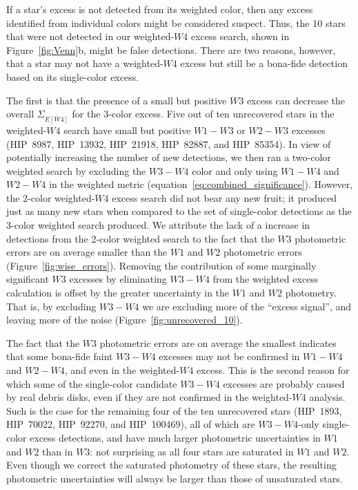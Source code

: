    	If a star's excess is not detected from its weighted color, then any excess identified from individual colors might be considered suspect. Thus, the 10 stars that were not detected in our weighted-$W4$ excess search, shown in Figure~\ref{fig:Venn}b, might be false detections. There are two reasons, however, that a star may not have a weighted-$W4$ excess but still be a bona-fide detection based on its single-color excess. 
   
   The first is that the presence of a small but positive $W3$ excess can decrease the overall $\Sigma_{\overline{E[W4]}}$ for the 3-color excess. Five %
   out of ten unrecovered stars in the weighted-$W4$ search have small but positive $W1-W3$ or $W2-W3$ excesses (HIP~8987, HIP~13932, HIP~21918, %
   HIP~82887, and HIP~85354). In view of potentially increasing the number of new detections, we then ran a two-color weighted search by excluding the $W3-W4$ color and only using $W1-W4$ and $W2-W4$ in the weighted metric (equation~\ref{eq:combined_significance}). However, the 2-color weighted-$W4$ excess search did not bear any new fruit; it produced just as many new stars when compared to the set of single-color detections as the 3-color weighted search produced. We attribute the lack of a increase in detections from the 2-color weighted search to the fact that the $W3$ photometric errors are on average smaller than the $W1$ and $W2$ photometric errors (Figure~\ref{fig:wise_errors}). Removing the contribution of some marginally significant $W3$ excesses by eliminating $W3-W4$ from the weighted excess calculation is offset by the greater uncertainty in the $W1$ and $W2$ photometry. That is, by excluding $W3-W4$ we are excluding more of the ``excess signal'', and leaving more of the noise (Figure~\ref{fig:unrecovered_10}).
   
   
    The fact that the $W3$ photometric errors are on average the smallest indicates that some bona-fide faint $W3-W4$ excesses may not be confirmed in $W1-W4$ and $W2-W4$, and even in the weighted-$W4$ excess.  This is the second reason for which some of the single-color candidate $W3-W4$ excesses are probably caused by real debris disks, even if they are not confirmed in the weighted-$W4$ analysis. Such is the case for the remaining four of the ten unrecovered stars (HIP~1893, HIP~70022, HIP~92270, and HIP~100469), all of which are $W3-W4$-only single-color excess detections, and have much larger photometric uncertainties in $W1$ and $W2$ than in $W3$: not surprising as all four stars are saturated in $W1$ and $W2$.  Even though we correct the saturated photometry of these stars, the resulting photometric uncertainties will always be larger than those of unsaturated stars.
    
